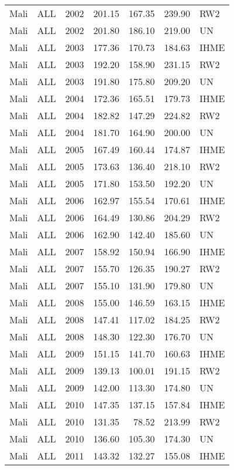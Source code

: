 \begin{longtable}{lllrrrl}
  Mali & ALL & 2002 & 201.15 & 167.35 & 239.90 & RW2 \\ 
  Mali & ALL & 2002 & 201.80 & 186.10 & 219.00 & UN \\ 
  Mali & ALL & 2003 & 177.36 & 170.73 & 184.63 & IHME \\ 
  Mali & ALL & 2003 & 192.20 & 158.90 & 231.15 & RW2 \\ 
  Mali & ALL & 2003 & 191.80 & 175.80 & 209.20 & UN \\ 
  Mali & ALL & 2004 & 172.36 & 165.51 & 179.73 & IHME \\ 
  Mali & ALL & 2004 & 182.82 & 147.29 & 224.82 & RW2 \\ 
  Mali & ALL & 2004 & 181.70 & 164.90 & 200.00 & UN \\ 
  Mali & ALL & 2005 & 167.49 & 160.44 & 174.87 & IHME \\ 
  Mali & ALL & 2005 & 173.63 & 136.40 & 218.10 & RW2 \\ 
  Mali & ALL & 2005 & 171.80 & 153.50 & 192.20 & UN \\ 
  Mali & ALL & 2006 & 162.97 & 155.54 & 170.61 & IHME \\ 
  Mali & ALL & 2006 & 164.49 & 130.86 & 204.29 & RW2 \\ 
  Mali & ALL & 2006 & 162.90 & 142.40 & 185.60 & UN \\ 
  Mali & ALL & 2007 & 158.92 & 150.94 & 166.90 & IHME \\ 
  Mali & ALL & 2007 & 155.70 & 126.35 & 190.27 & RW2 \\ 
  Mali & ALL & 2007 & 155.10 & 131.90 & 179.80 & UN \\ 
  Mali & ALL & 2008 & 155.00 & 146.59 & 163.15 & IHME \\ 
  Mali & ALL & 2008 & 147.41 & 117.02 & 184.25 & RW2 \\ 
  Mali & ALL & 2008 & 148.30 & 122.30 & 176.70 & UN \\ 
  Mali & ALL & 2009 & 151.15 & 141.70 & 160.63 & IHME \\ 
  Mali & ALL & 2009 & 139.13 & 100.01 & 191.15 & RW2 \\ 
  Mali & ALL & 2009 & 142.00 & 113.30 & 174.80 & UN \\ 
  Mali & ALL & 2010 & 147.35 & 137.15 & 157.84 & IHME \\ 
  Mali & ALL & 2010 & 131.35 & 78.52 & 213.99 & RW2 \\ 
  Mali & ALL & 2010 & 136.60 & 105.30 & 174.30 & UN \\ 
  Mali & ALL & 2011 & 143.32 & 132.27 & 155.08 & IHME \\ 

\end{longtable}
